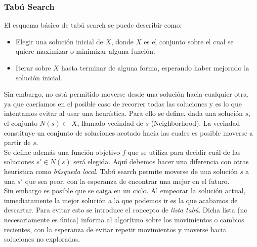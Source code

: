 \subsubsection{Tabú Search}
El esquema básico de tabú search se puede describir como:
\begin{itemize}
 \item Elegir una solución inicial de $X$, donde $X$ es el conjunto sobre el cual se quiere maximizar o minimizar alguna función.
\item Iterar sobre $X$ hasta terminar de alguna forma, esperando haber mejorado la solución inicial.
\end{itemize}
Sin embargo, no está permitido moverse desde una solución hacia cualquier otra, ya que caeríamos en el posible caso de recorrer todas las soluciones y es 
lo que intentamos evitar al usar una heurística. Para ello se define, dada una solución $s$, el conjunto $N(s) \subset\ X$, llamado vecindad de $s$ (Neighborhood). 
La vecindad constituye un conjunto de soluciones acotado hacia las cuales es posible moverse a partir de $s$. \\
Se define además una función objetivo $f$ que se utiliza para decidir cuál de las soluciones $s' \in N(s)$ será elegida. Aquí debemos hacer una diferencia con otras heurística 
como \textit{búsqueda local}. Tabú search permite moverse de una solución $s$ a una $s'$ que sea peor, con la esperanza de encontrar una mejor en el futuro.\\
Sin embargo es posible que se caiga en un ciclo. Al empeorar la solución actual, inmediatamente la mejor solución a la que podemos ir es la que acabamos de descartar. Para evitar 
esto se introduce el concepto de \textit{lista tabú}. Dicha lista (no necesariamente es única) informa al algorítmo sobre los movimientos o cambios recientes, con la esperanza de evitar 
repetir movimientos y moverse hacia soluciones no exploradas.

